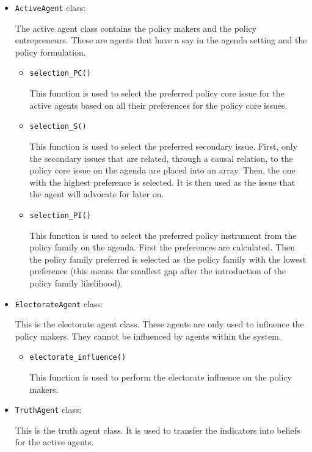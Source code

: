 \begin{itemize}
\item \texttt{ActiveAgent} class:

The active agent class contains the policy makers and the policy entrepreneurs. These are agents that have a say in the agenda setting and the policy formulation.

	\begin{itemize}
	\item \texttt{selection\_PC()}
	
	This function is used to select the preferred policy core issue for the active agents based on all their preferences for the policy core issues.
	
	\item \texttt{selection\_S()}
	
	This function is used to select the preferred secondary issue. First, only the secondary issues that are related, through a causal relation, to the policy core issue on the agenda are placed into an array. Then, the one with the highest preference is selected. It is then used as the issue that the agent will advocate for later on.
	\item \texttt{selection\_PI()}
	
	This function is used to select the preferred policy instrument from the policy family on the agenda. First the preferences are calculated. Then the policy family preferred is selected as the policy family with the lowest preference (this means the smallest gap after the introduction of the policy family likelihood).

	\end{itemize}

\item \texttt{ElectorateAgent} class:

This is the electorate agent class. These agents are only used to influence the policy makers. They cannot be influenced by agents within the system.

	\begin{itemize}
	\item \texttt{electorate\_influence()}
	
	This function is used to perform the electorate influence on the policy makers.
	\end{itemize}
	
\item \texttt{TruthAgent} class:

This is the truth agent class. It is used to transfer the indicators into beliefs for the active agents.

\end{itemize}

